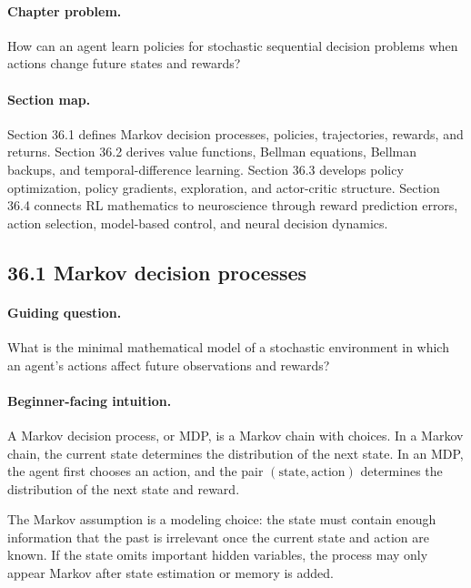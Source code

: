 \paragraph{Chapter problem.}
How can an agent learn policies for stochastic sequential decision problems when actions change future states and rewards?

\paragraph{Section map.}
Section 36.1 defines Markov decision processes, policies, trajectories, rewards, and returns. Section 36.2 derives value functions, Bellman equations, Bellman backups, and temporal-difference learning. Section 36.3 develops policy optimization, policy gradients, exploration, and actor-critic structure. Section 36.4 connects RL mathematics to neuroscience through reward prediction errors, action selection, model-based control, and neural decision dynamics.

\subsection{36.1 Markov decision processes}

\paragraph{Guiding question.}
What is the minimal mathematical model of a stochastic environment in which an agent's actions affect future observations and rewards?

\paragraph{Beginner-facing intuition.}
A Markov decision process, or MDP, is a Markov chain with choices. In a Markov chain, the current state determines the distribution of the next state. In an MDP, the agent first chooses an action, and the pair \((\text{state},\text{action})\) determines the distribution of the next state and reward.

The Markov assumption is a modeling choice: the state must contain enough information that the past is irrelevant once the current state and action are known. If the state omits important hidden variables, the process may only appear Markov after state estimation or memory is added.

